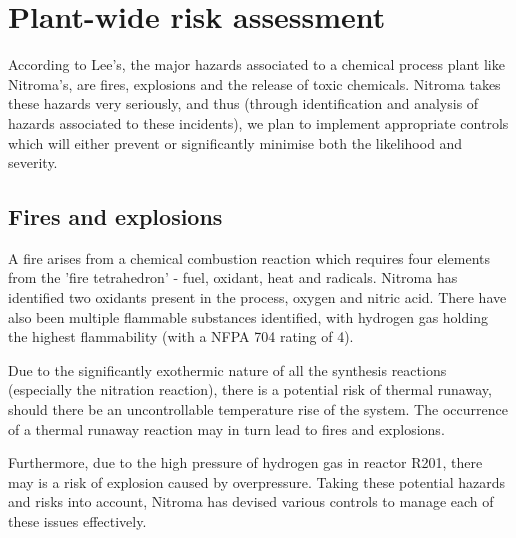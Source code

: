 \section{Plant-wide risk assessment}

According to Lee’s, the major hazards associated to a chemical process plant like Nitroma’s, are fires, explosions and the release of toxic chemicals. Nitroma takes these hazards very seriously, and thus (through identification and analysis of hazards associated to these incidents), we plan to implement appropriate controls which will either prevent or significantly minimise both the likelihood and severity. 


\subsection{Fires and explosions}

A fire arises from a chemical combustion reaction which requires four elements from the 'fire tetrahedron' - fuel, oxidant, heat and radicals. Nitroma has identified two oxidants present in the process, oxygen and nitric acid. There have also been multiple flammable substances identified, with hydrogen gas holding the highest flammability (with a NFPA 704 rating of 4). 

Due to the significantly exothermic nature of all the synthesis reactions (especially the nitration reaction), there is a potential risk of thermal runaway, should there be an uncontrollable temperature rise of the system. The occurrence of a thermal runaway reaction may in turn lead to fires and explosions.  

Furthermore, due to the high pressure of hydrogen gas in reactor R201, there may is a risk of explosion caused by overpressure. Taking these potential hazards and risks into account, Nitroma has devised various controls to manage each of these issues effectively.  


